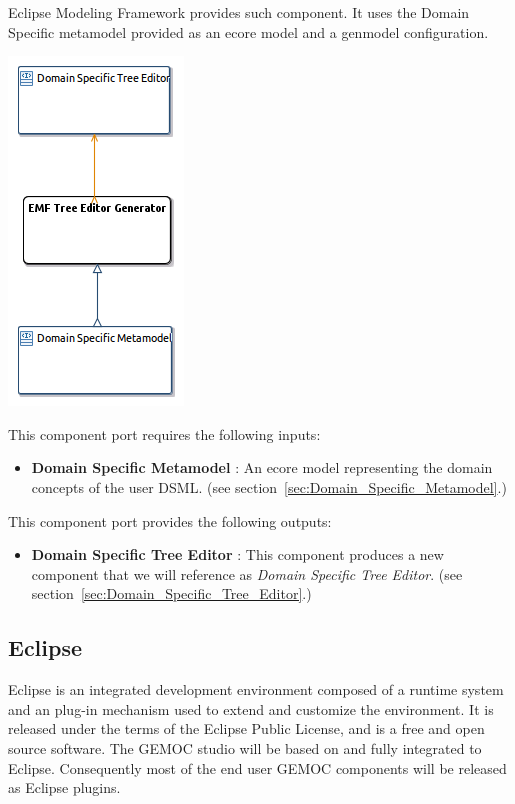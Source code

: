 \documentclass{gemoc} %
\begin{document}
Eclipse Modeling Framework provides such component. It uses the Domain Specific metamodel provided as an ecore model and a genmodel configuration.
\begin{center}
\includegraphics*[trim=0.0cm 0.0cm 0cm 0.0cm, clip=true]{../images/generated/Generated_EMF_Tree_Editor_Generator.png}
\end{center}

This component port requires the following inputs:
\begin{itemize}
  \item \textbf{Domain Specific Metamodel} :
An ecore model representing the domain concepts of the user DSML.
(see section~\ref{sec:Domain_Specific_Metamodel}.)
\end{itemize}

This component port provides the following outputs:
\begin{itemize}
  \item \textbf{Domain Specific Tree Editor} :
This component produces a new component that we will reference as \emph{Domain Specific Tree Editor}.
(see section~\ref{sec:Domain_Specific_Tree_Editor}.)
\end{itemize}


\subsection{Eclipse}
\label{sec:Eclipse}
Eclipse is an integrated development environment composed of a runtime system and an plug-in mechanism used to extend and customize the environment. It is released under the terms of the Eclipse Public License, and is a free and open source software. The GEMOC studio will be based on and fully integrated to Eclipse. Consequently most of the end user GEMOC components will be released as Eclipse plugins.
\end{document}
